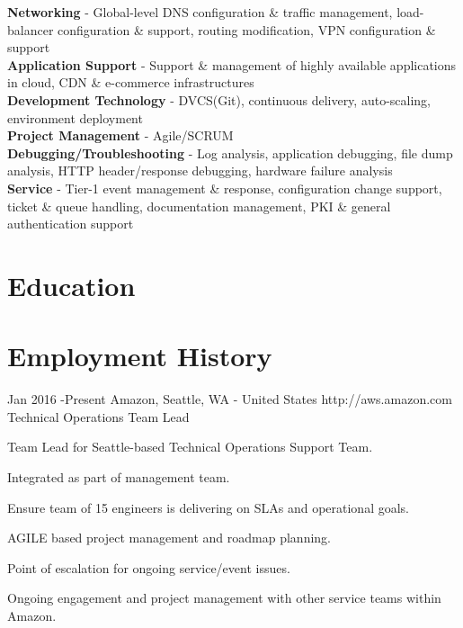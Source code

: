 \documentclass[10pt]{article} %
\begin{document}

{
\textbf{Networking} - Global-level DNS configuration \& traffic management, load-balancer configuration \& support, routing modification, VPN configuration \& support  \\
\textbf{Application Support} - Support \& management of highly available applications in cloud, CDN \& e-commerce infrastructures\\
\textbf{Development Technology} - DVCS(Git), continuous delivery, auto-scaling, environment deployment\\
\textbf{Project Management} - Agile/SCRUM\\
\textbf{Debugging/Troubleshooting} - Log analysis, application debugging, file dump analysis, HTTP header/response debugging, hardware failure analysis \\
\textbf{Service} - Tier-1 event management \& response, configuration change support, ticket \& queue handling, documentation management, PKI \& general authentication support
}


\section{Education}



\section{Employment History}

\job
{Jan 2016 -}{Present}
{Amazon, Seattle, WA - United States}
{http://aws.amazon.com}
{Technical Operations Team Lead}
{
\begin{itemize-noindent}
\item{Team Lead for Seattle-based Technical Operations Support Team.}
\item{Integrated as part of management team.}
\item{Ensure team of 15 engineers is delivering on SLAs and operational goals.}
\item{AGILE based project management and roadmap planning.}
\item{Point of escalation for ongoing service/event issues.}
\item{Ongoing engagement and project management with other service teams within Amazon.}
\end{itemize-noindent}

}
	
\end{document}
